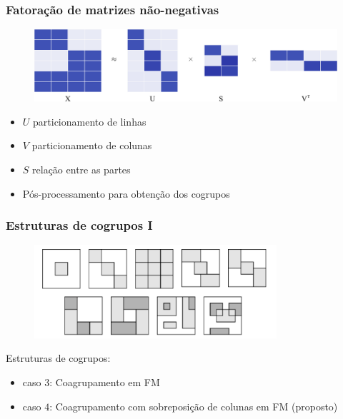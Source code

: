 \documentclass[10pt]{beamer}
\begin{document}

\begin{frame}
  \frametitle{Fatoração de matrizes não-negativas}
  \begin{figure}[H]
    \centering
    \includegraphics[width=1.0\textwidth]{img/factorizationXUSV.png}
  \end{figure}

  \begin{itemize}
    \item $U$ particionamento de linhas
    \item $V$ particionamento de colunas
    \item $S$ relação entre as partes
    \item Pós-processamento para obtenção dos cogrupos
  \end{itemize}
\end{frame}


\begin{frame}
  \frametitle{Estruturas de cogrupos I}

  \begin{figure}[H]
    \centering
      \includegraphics[width=0.8\textwidth]{img/synteticBiclusters.png}
  \end{figure}

  Estruturas de cogrupos:
  \begin{itemize}
    \item caso $3$: Coagrupamento em FM
    \item caso $4$: Coagrupamento com sobreposição de colunas em FM (proposto)
  \end{itemize}
\end{frame}
\end{document}
